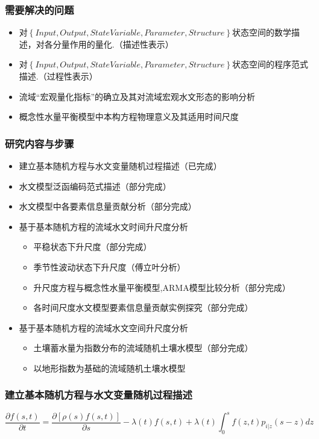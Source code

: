 \documentclass{beamer}
\begin{document}
\begin{CJK}{UTF8}{gkai}
\begin{frame}
\frametitle{需要解决的问题}
\begin{itemize}
\item 对$\left\{{Input,Output,State Variable,Parameter, Structure}\right\}$状态空间的数学描述，对各分量作用的量化.（描述性表示）
\item 对$\left\{{Input,Output,State Variable,Parameter, Structure}\right\}$状态空间的程序范式描述.（过程性表示）
\item 流域“宏观量化指标”的确立及其对流域宏观水文形态的影响分析
\item 概念性水量平衡模型中本构方程物理意义及其适用时间尺度
\end{itemize}
\end{frame}

\begin{frame}
\frametitle{研究内容与步骤}
\begin{itemize}
\item 建立基本随机方程与水文变量随机过程描述（已完成）
\item 水文模型泛函编码范式描述（部分完成）
\item 水文模型中各要素信息量贡献分析（部分完成）
\item 基于基本随机方程的流域水文时间升尺度分析
\begin{itemize}
\item 平稳状态下升尺度（部分完成）
\item 季节性波动状态下升尺度（傅立叶分析）
\item 升尺度方程与概念性水量平衡模型,ARMA模型比较分析（部分完成）
\item 各时间尺度水文模型要素信息量贡献实例探究（部分完成）
\end{itemize}
\item 基于基本随机方程的流域水文空间升尺度分析
\begin{itemize}
\item 土壤蓄水量为指数分布的流域随机土壤水模型（部分完成）
\item 以地形指数为基础的流域随机土壤水模型
\end{itemize}
\end{itemize}
\end{frame}

\begin{frame}
\frametitle{建立基本随机方程与水文变量随机过程描述}
 \begin{equation}
 \frac{\partial{f(s,t)}}{\partial t}=\frac{\partial{[\rho(s)f(s,t)]}}{\partial s}-\lambda(t)f(s,t)+\lambda(t)\int_{0}^{s} f(z,t)p_{i|z}(s-z)dz
 \end{equation}


\end{frame}
\end{CJK}
\end{document}
